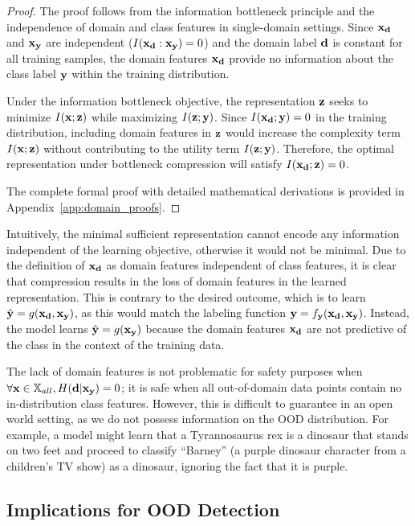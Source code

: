 \documentclass[11pt, oneside]{book}
\theoremstyle{plain}
\theoremstyle{definition}
\theoremstyle{remark}
\begin{document}
\begin{proof}
The proof follows from the information bottleneck principle and the independence of domain and class features in single-domain settings. Since ${\mathbf{x}}_{\mathbf{d}}$ and ${\mathbf{x}}_{\mathbf{y}}$ are independent ($I({\mathbf{x}}_{\mathbf{d}}:{\mathbf{x}}_{\mathbf{y}}) = 0$) and the domain label ${\mathbf{d}}$ is constant for all training samples, the domain features ${\mathbf{x}}_{\mathbf{d}}$ provide no information about the class label ${\mathbf{y}}$ within the training distribution.

Under the information bottleneck objective, the representation ${\mathbf{z}}$ seeks to minimize $I({\mathbf{x}}; {\mathbf{z}})$ while maximizing $I({\mathbf{z}}; {\mathbf{y}})$. Since $I({\mathbf{x}}_{\mathbf{d}}; {\mathbf{y}}) = 0$ in the training distribution, including domain features in ${\mathbf{z}}$ would increase the complexity term $I({\mathbf{x}}; {\mathbf{z}})$ without contributing to the utility term $I({\mathbf{z}}; {\mathbf{y}})$. Therefore, the optimal representation under bottleneck compression will satisfy $I({\mathbf{x}}_{\mathbf{d}}; {\mathbf{z}}) = 0$.

The complete formal proof with detailed mathematical derivations is provided in Appendix~\ref{app:domain_proofs}.
\end{proof}

Intuitively, the minimal sufficient representation cannot encode any information independent of the learning objective, otherwise it would not be minimal. Due to the definition of ${\mathbf{x}}_{\mathbf{d}}$ as domain features independent of class features, it is clear that compression results in the loss of domain features in the learned representation. This is contrary to the desired outcome, which is to learn $\hat{{\mathbf{y}}} = g({\mathbf{x}}_{\mathbf{d}}, {\mathbf{x}}_{\mathbf{y}})$, as this would match the labeling function ${\mathbf{y}} = f_{\mathbf{y}}({\mathbf{x}}_{\mathbf{d}}, {\mathbf{x}}_{\mathbf{y}})$. Instead, the model learns $\hat{{\mathbf{y}}} = g({\mathbf{x}}_{\mathbf{y}})$ because the domain features ${\mathbf{x}}_{\mathbf{d}}$ are not predictive of the class in the context of the training data.

The lack of domain features is not problematic for safety purposes when $\forall {\mathbf{x}} \in {\mathbb{X}}_{all}, H({\mathbf{d}}|{\mathbf{x}}_{\mathbf{y}}) = 0$; it is safe when all out-of-domain data points contain no in-distribution class features. However, this is difficult to guarantee in an open world setting, as we do not possess information on the OOD distribution. For example, a model might learn that a Tyrannosaurus rex is a dinosaur that stands on two feet and proceed to classify ``Barney'' (a purple dinosaur character from a children's TV show) as a dinosaur, ignoring the fact that it is purple.

\subsection{Implications for OOD Detection}
\end{document}

